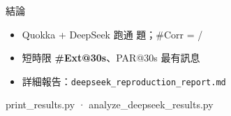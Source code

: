 \begin{frame}{結論}
  \vspace{0.3em}
  \begin{itemize}
    \item Quokka + DeepSeek 跑通 \NumBenchmarks{} 題；\#Corr = \DSZCorr/\NumBenchmarks{}
    \item 短時限 \textbf{\#Ext@30s}、PAR@30s 最有訊息
    \item 詳細報告：\texttt{deepseek\_reproduction\_report.md}
  \end{itemize}
  \vfill
  {\footnotesize\textcolor{SeriesPaper}{print\_results.py · analyze\_deepseek\_results.py}\par}
\end{frame}

